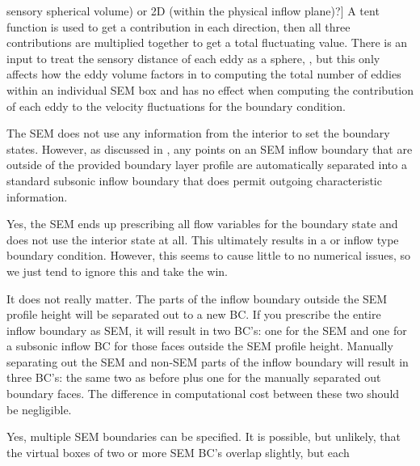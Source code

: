 \begin{QandA}
    sensory spherical volume) or 2D (within the physical inflow plane)?]
    A tent function is used to get a contribution in each direction,
    then all three contributions are multiplied together to get a total
    fluctuating value. There is an input to treat the sensory distance of each
    eddy as a sphere,
    ,
    but this only affects how the eddy volume factors in to computing the total
    number of eddies within an individual SEM box and has no effect when
    computing the contribution of each eddy to the velocity fluctuations for the
    boundary condition.
%
  \item[What characteristic information feeds upstream?]
    The SEM does not use any information from the interior to set the boundary
    states.
    However, as discussed in , any points on an
    SEM inflow boundary that are outside of the provided boundary layer profile
    are automatically separated into a standard subsonic inflow boundary
    that does permit outgoing characteristic information.
%
  \item[For subsonic flow, does SEM overprescribe the flow conditions?]
    Yes, the SEM ends up prescribing all flow variables for the boundary state
    and does not use the interior state at all. This ultimately results in a
     or  inflow type boundary condition.
    However, this seems to cause little to no numerical issues, so we just tend
    to ignore this and take the win.
%
  \item[Should the entire inflow boundary be prescribed SEM or only some
    portion?]
    It does not really matter. The parts of the inflow boundary outside the SEM
    profile height will be separated out to a new BC. If you prescribe the
    entire inflow boundary as SEM, it will result in two BC's: one for the SEM
    and one for a subsonic inflow BC for those faces outside the SEM profile
    height. Manually separating out the SEM and non-SEM parts of the inflow
    boundary will result in three BC's: the same two as before plus one for the
    manually separated out boundary faces. The difference in computational cost
    between these two should be negligible. 
%
  \item[Is more than one SEM permitted?]
    Yes, multiple SEM boundaries can be specified. It is possible, but unlikely,
    that the virtual boxes of two or more SEM BC's overlap slightly, but each

\end{QandA}
